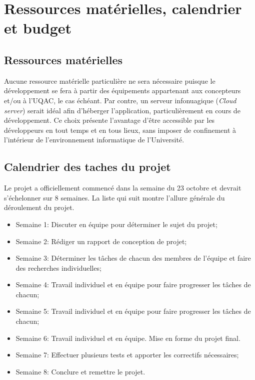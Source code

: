 \documentclass[12pt]{article}
\begin{document}
\section{Ressources matérielles, calendrier et budget}

\subsection{Ressources matérielles}

Aucune ressource matérielle particulière ne sera nécessaire puisque le développement se fera à partir des équipements appartenant aux concepteurs et/ou à l'UQAC, le cas échéant.  Par contre, un serveur infonuagique (\textit{Cloud server}) serait idéal afin d'héberger l'application, particulièrement en cours de développement.  Ce choix présente l'avantage d'être accessible par les développeurs en tout temps et en tous lieux, sans imposer de confinement à l'intérieur de l'environnement informatique de l'Université.

\subsection{Calendrier des taches du projet}

Le projet a officiellement commencé dans la semaine du 23 octobre et devrait s'échelonner sur 8 semaines. La liste qui suit montre l'allure générale du déroulement du projet.

\begin{itemize}
    \item Semaine 1: Discuter en équipe pour déterminer le sujet du projet;
    \item Semaine 2: Rédiger un rapport de conception de projet;
    \item Semaine 3: Déterminer les tâches de chacun des membres de l'équipe et faire des recherches individuelles;
    \item Semaine 4: Travail individuel et en équipe pour faire progresser les tâches de chacun;
    \item Semaine 5: Travail individuel et en équipe pour faire progresser les tâches de chacun;
    \item Semaine 6: Travail individuel et en équipe. Mise en forme du projet final.
    \item Semaine 7: Effectuer plusieurs tests et apporter les correctifs nécessaires;
    \item Semaine 8: Conclure et remettre le projet. \\
\end{itemize}
\end{document}
